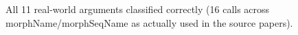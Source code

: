 \documentclass{article}
\begin{document}


All 11 real-world arguments classified correctly (16 calls across
morphName/morphSeqName as actually used in the source papers).
\end{document}
